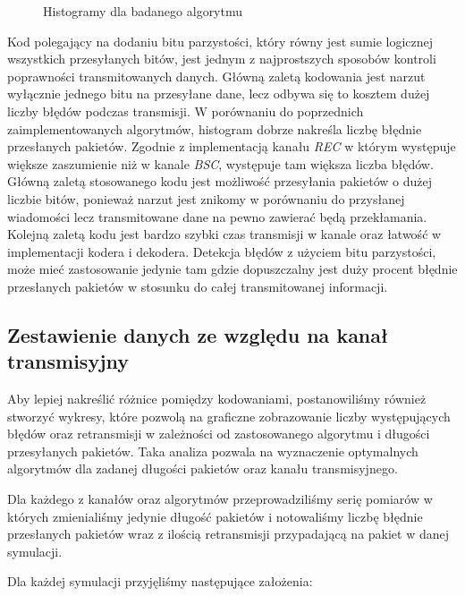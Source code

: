 \documentclass{article}
\begin{document}
\newpage

\begin{figure}[h!]
\centering
{}
\qquad 
{}
\caption{Histogramy dla badanego algorytmu}
\end{figure}

Kod polegający na dodaniu bitu parzystości, który równy jest sumie logicznej wszystkich przesyłanych bitów, jest jednym z najprostszych sposobów kontroli poprawności transmitowanych danych. Główną zaletą kodowania jest narzut wyłącznie jednego bitu na przesyłane dane, lecz odbywa się to kosztem dużej liczby błędów podczas transmisji. W porównaniu do poprzednich zaimplementowanych algorytmów, histogram dobrze nakreśla liczbę błędnie przesłanych pakietów. Zgodnie z implementacją kanału \textit{REC} w którym występuje większe zaszumienie niż w kanale \textit{BSC}, występuje tam większa liczba błędów. Główną zaletą stosowanego kodu jest możliwość przesyłania pakietów o dużej liczbie bitów, ponieważ narzut jest znikomy w porównaniu do przysłanej wiadomości lecz transmitowane dane na pewno zawierać będą przekłamania. Kolejną zaletą kodu jest bardzo szybki czas transmisji w kanale oraz łatwość w implementacji kodera i dekodera. Detekcja błędów z użyciem bitu parzystości, może mieć zastosowanie jedynie tam gdzie dopuszczalny jest duży procent błędnie przesłanych pakietów w stosunku do całej transmitowanej informacji.


\subsection{Zestawienie danych ze względu na kanał transmisyjny}

Aby lepiej nakreślić różnice pomiędzy kodowaniami, postanowiliśmy również stworzyć wykresy, które pozwolą na graficzne zobrazowanie liczby występujących błędów oraz retransmisji w zależności od zastosowanego algorytmu i długości przesyłanych pakietów. Taka analiza pozwala na wyznaczenie optymalnych algorytmów dla zadanej długości pakietów oraz kanału transmisyjnego.

Dla każdego z kanałów oraz algorytmów przeprowadziliśmy serię pomiarów w których zmienialiśmy jedynie długość pakietów i notowaliśmy liczbę błędnie przesłanych pakietów wraz z ilością retransmisji przypadającą na pakiet w danej symulacji.

Dla każdej symulacji przyjęliśmy następujące założenia:
\end{document}
